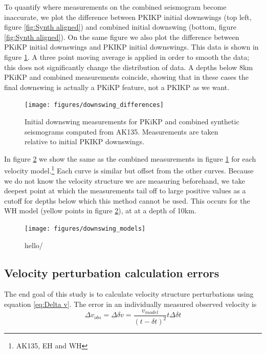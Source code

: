 \documentclass[11pt,a4paper]{article}
\begin{document}
To quantify where measurements on the combined seismogram become inaccurate, we plot the difference between PKIKP initial downswings (top left, figure \ref{fig:Synth aligned}) and combined initial downswing (bottom, figure \ref{fig:Synth aligned}). On the same figure we also plot the difference between PKiKP initial downswings and PKIKP initial downswings. This data is shown in figure \ref{fig:Downswing differences}. A three point moving average is applied in order to smooth the data; this does not significantly change the distribution of data. A depths below 8km PKiKP and combined measurements coincide, showing that in these cases the final downswing is actually a PKiKP feature, not a PKIKP as we want.

\begin{figure}
	\centering
	\texttt{[image: figures/downswing\_differences]}
	\caption{Initial downswing measurements for PKiKP and combined synthetic seismograms computed from AK135. Measurements are taken relative to initial PKIKP downswings.}
	\label{fig:Downswing differences}
\end{figure}

In figure \ref{fig:Downswing models} we show the same as the combined measurements in figure \ref{fig:Downswing differences} for each velocity model.\footnote{AK135, EH and WH} Each curve is similar but offset from the other curves. Because we do not know the velocity structure we are measuring beforehand, we take deepest point at which the measurements tail off to large positive values as a cutoff for depths below which this method cannot be used. This occurs for the WH model (yellow points in figure \ref{fig:Downswing models}), at at a depth of 10km.

\begin{figure}
	\centering
	\texttt{[image: figures/downswing\_models]}
	\caption{hello/}
	\label{fig:Downswing models}
\end{figure}

\subsection{Velocity perturbation calculation errors}
The end goal of this study is to calculate velocity structure perturbations using equation \eqref{eq:Delta v}. The error in an individually measured observed velocity is
\begin{equation}
	\Delta v_{obs} = \Delta \delta v = \frac{v_{model}}{\left( t - \delta t\right )^{2}} t\Delta \delta t 
	\label{eq:Velocity error}
\end{equation}
\end{document}
